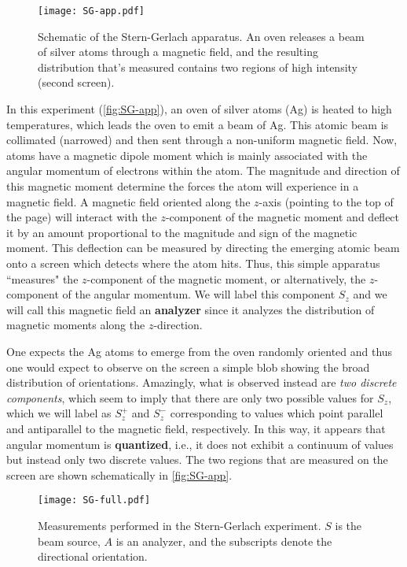 \begin{figure}[!h]
	\centering
	\texttt{[image: SG-app.pdf]}
	\caption{Schematic of the Stern-Gerlach apparatus. 
	An oven releases a beam of silver atoms through a magnetic field, and the resulting distribution that's measured contains two regions of high intensity (second screen).}
	\label{fig:SG-app}
\end{figure}

In this experiment (\autoref{fig:SG-app}), an oven of silver atoms (Ag) is heated to high temperatures, which leads the oven to emit a beam of Ag. 
This atomic beam is collimated (narrowed) and then sent through a non-uniform magnetic field. 
Now, atoms have a magnetic dipole moment which is mainly associated with the angular momentum of electrons within the atom. 
The magnitude and direction of this magnetic moment determine the forces the atom will experience in a magnetic field. 
A magnetic field oriented along the $z$-axis (pointing to the top of the page) will interact with the $z$-component of the magnetic moment and deflect it by an amount proportional to the magnitude and sign of the magnetic moment. 
This deflection can be measured by directing the emerging atomic beam onto a screen which detects where the atom hits. 
Thus, this simple apparatus ``measures" the $z$-component of the magnetic moment, or alternatively, the $z$-component of the angular momentum. 
We will label this component $S_z$ and we will call this magnetic field an \textbf{analyzer} since it analyzes the distribution of magnetic moments along the $z$-direction. \par

One expects the Ag atoms to emerge from the oven randomly oriented and thus one would expect to observe on the screen a simple blob showing the broad distribution of orientations. 
Amazingly, what is observed instead are \emph{two discrete components}, which seem to imply that there are only two possible values for $S_z$, which we will label as $S_z^+$ and $S_z^-$ corresponding to values which point parallel and antiparallel to the magnetic field, respectively. 
In this way, it appears that angular momentum is \textbf{quantized}, i.e., it does not exhibit a continuum of values but instead only two discrete values. 
The two regions that are measured on the screen are shown schematically in \autoref{fig:SG-app}.

\begin{figure}[!h]
	\centering
	\texttt{[image: SG-full.pdf]}
	\caption{Measurements performed in the Stern-Gerlach experiment. $S$ is the beam source, $A$ is an analyzer, and the subscripts denote the directional orientation.}
	\label{fig:SG-full}
\end{figure}

